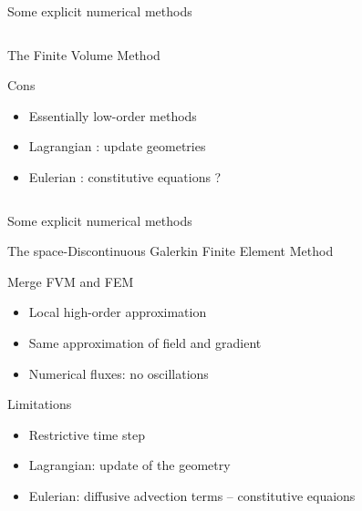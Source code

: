 \begin{withoutheadline}
\begin{frame}{Some explicit numerical methods}
\begin{overprint}
\begin{columns}
\begin{column}{0.49\textwidth}
\begin{block}{The Finite Volume Method \cite{Leveque}}
\begin{footnotesize}
\begin{block}{\footnotesize Cons}
\begin{itemize}
                \item[] Essentially low-order methods
                \item[] Lagrangian \cite{Haider_FVM}: update geometries  
                \item[] Eulerian \cite{Gavrilyuk}: constitutive equations ?
                \end{itemize}
              \end{block}
            \end{footnotesize}
          \end{block}
        \end{column}
      \end{columns}
      \vspace{-0.3cm} 
    \end{overprint}
  \end{frame}
\end{withoutheadline}

\begin{withoutheadline}
  \begin{frame}{Some explicit numerical methods}
    \begin{block}{The space-Discontinuous Galerkin Finite Element Method \cite{Cockburn}}
      \begin{footnotesize}
        \begin{block}{\footnotesize Merge FVM and FEM}
          \vspace{-.2cm}
          \begin{itemize}
          \item[] Local high-order approximation \cite{NeutronDG}
          \item[] Same approximation of field and gradient
          \item[] Numerical fluxes: no oscillations
          \end{itemize}
        \end{block}
        \vspace{-.2cm}
        \begin{block}{\footnotesize Limitations}
          \vspace{-.2cm}
          \begin{itemize}
          \item[] Restrictive time step
          \item[] \alert{Lagrangian: update of the geometry \cite{LagrangianDG_thesis}}
          \item[] Eulerian: diffusive advection terms -- constitutive equaions 
          \end{itemize}
        \end{block}
      \end{footnotesize}
    \end{block}
  \end{frame}
\end{withoutheadline}


